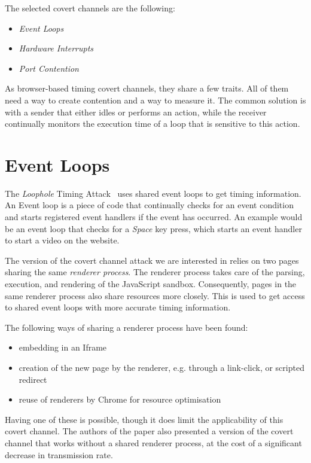 \documentclass[11pt,
  titlepage=false,
  parskip=half,      %
]{scrreprt}
\begin{document}
\pagebreak
The selected covert channels are the following:
\begin{itemize}
    \item \textit{Event Loops}~\cite{vila2017loophole}
    \item \textit{Hardware Interrupts}~\cite{lipp2017practical}
    \item \textit{Port Contention}~\cite{Rokicki2022webport}
\end{itemize}

As browser-based timing covert channels, they share a few traits.
All of them need a way to create contention and a way to measure it.
The common solution is with a sender that either idles or performs an action,
while the receiver continually monitors the execution time of a loop that is sensitive to this action.

\section{Event Loops}
The \textit{Loophole} Timing Attack~\cite{vila2017loophole} uses shared event loops to get timing information.
An Event loop is a piece of code that continually checks for an event condition
and starts registered event handlers if the event has occurred.
An example would be an event loop that checks for a \textit{Space} key press,
which starts an event handler to start a video on the website.

The version of the covert channel attack we are interested in relies on two pages sharing the same \textit{renderer process}.
The renderer process takes care of the parsing, execution, and rendering of the JavaScript sandbox.
Consequently, pages in the same renderer process also share resources more closely.
This is used to get access to shared event loops with more accurate timing information.

The following ways of sharing a renderer process have been found:

\begin{itemize}
    \item embedding in an Iframe
    \item creation of the new page by the renderer, e.g. through a link-click, or scripted redirect
    \item reuse of renderers by Chrome for resource optimisation
\end{itemize}

Having one of these is possible, though it does limit the applicability of this covert channel.
The authors of the paper also presented a version of the covert channel that works without a shared renderer process,
at the cost of a significant decrease in transmission rate.
\end{document}
